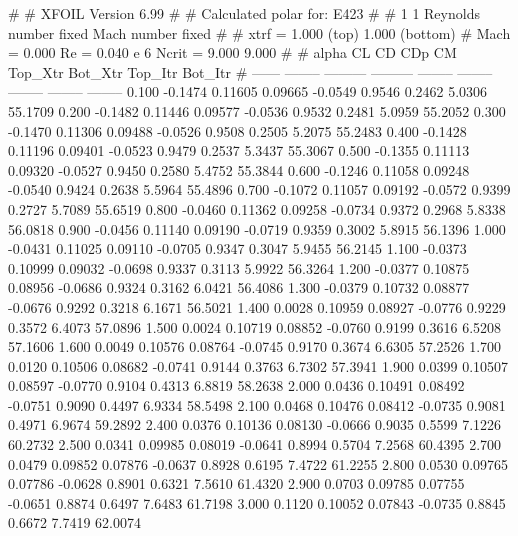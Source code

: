 #  
#       XFOIL         Version 6.99
#  
# Calculated polar for: E423                                            
#  
# 1 1 Reynolds number fixed          Mach number fixed         
#  
# xtrf =   1.000 (top)        1.000 (bottom)  
# Mach =   0.000     Re =     0.040 e 6     Ncrit =   9.000  9.000
#  
#   alpha    CL        CD       CDp       CM     Top_Xtr  Bot_Xtr  Top_Itr  Bot_Itr
#  ------ -------- --------- --------- -------- -------- -------- -------- --------
   0.100  -0.1474   0.11605   0.09665  -0.0549   0.9546   0.2462   5.0306  55.1709
   0.200  -0.1482   0.11446   0.09577  -0.0536   0.9532   0.2481   5.0959  55.2052
   0.300  -0.1470   0.11306   0.09488  -0.0526   0.9508   0.2505   5.2075  55.2483
   0.400  -0.1428   0.11196   0.09401  -0.0523   0.9479   0.2537   5.3437  55.3067
   0.500  -0.1355   0.11113   0.09320  -0.0527   0.9450   0.2580   5.4752  55.3844
   0.600  -0.1246   0.11058   0.09248  -0.0540   0.9424   0.2638   5.5964  55.4896
   0.700  -0.1072   0.11057   0.09192  -0.0572   0.9399   0.2727   5.7089  55.6519
   0.800  -0.0460   0.11362   0.09258  -0.0734   0.9372   0.2968   5.8338  56.0818
   0.900  -0.0456   0.11140   0.09190  -0.0719   0.9359   0.3002   5.8915  56.1396
   1.000  -0.0431   0.11025   0.09110  -0.0705   0.9347   0.3047   5.9455  56.2145
   1.100  -0.0373   0.10999   0.09032  -0.0698   0.9337   0.3113   5.9922  56.3264
   1.200  -0.0377   0.10875   0.08956  -0.0686   0.9324   0.3162   6.0421  56.4086
   1.300  -0.0379   0.10732   0.08877  -0.0676   0.9292   0.3218   6.1671  56.5021
   1.400   0.0028   0.10959   0.08927  -0.0776   0.9229   0.3572   6.4073  57.0896
   1.500   0.0024   0.10719   0.08852  -0.0760   0.9199   0.3616   6.5208  57.1606
   1.600   0.0049   0.10576   0.08764  -0.0745   0.9170   0.3674   6.6305  57.2526
   1.700   0.0120   0.10506   0.08682  -0.0741   0.9144   0.3763   6.7302  57.3941
   1.900   0.0399   0.10507   0.08597  -0.0770   0.9104   0.4313   6.8819  58.2638
   2.000   0.0436   0.10491   0.08492  -0.0751   0.9090   0.4497   6.9334  58.5498
   2.100   0.0468   0.10476   0.08412  -0.0735   0.9081   0.4971   6.9674  59.2892
   2.400   0.0376   0.10136   0.08130  -0.0666   0.9035   0.5599   7.1226  60.2732
   2.500   0.0341   0.09985   0.08019  -0.0641   0.8994   0.5704   7.2568  60.4395
   2.700   0.0479   0.09852   0.07876  -0.0637   0.8928   0.6195   7.4722  61.2255
   2.800   0.0530   0.09765   0.07786  -0.0628   0.8901   0.6321   7.5610  61.4320
   2.900   0.0703   0.09785   0.07755  -0.0651   0.8874   0.6497   7.6483  61.7198
   3.000   0.1120   0.10052   0.07843  -0.0735   0.8845   0.6672   7.7419  62.0074
